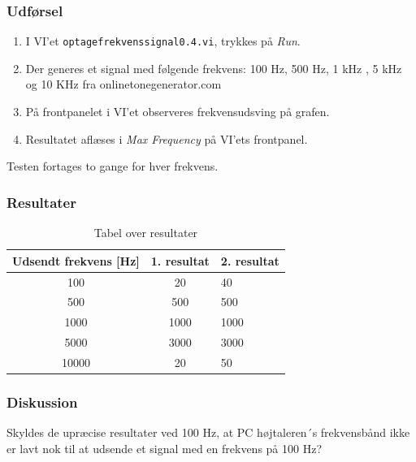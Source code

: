 		\subsubsection{Udførsel}
			\begin{enumerate}
				\item I VI'et \texttt{optagefrekvenssignal0.4.vi}, trykkes på \textit{Run}.  
				\item Der generes et signal med følgende frekvens: 100 Hz, 500 Hz, 1 kHz , 5 kHz og 10 KHz fra onlinetonegenerator.com
				\item På frontpanelet i VI'et observeres frekvensudsving på grafen.  
				\item Resultatet aflæses i \textit{Max Frequency} på VI'ets frontpanel.
			\end{enumerate}
			
			Testen fortages to gange for hver frekvens.  
		
		\subsubsection{Resultater}
		
		\begin{table}[]
				\centering
				\caption{Tabel over resultater}
				\label{bordtest5resultater}
				\begin{tabular}{lll}
					\multicolumn{1}{l|}{\textbf{Udsendt frekvens {[}Hz{]}}} & 	
					\multicolumn{1}{l|}{\textbf{1. resultat}} & \textbf{2. resultat} \\ \hline
					\multicolumn{1}{c|}{100}& 
					\multicolumn{1}{c|}{20}&40\\
					\multicolumn{1}{c|}{500}& 
					\multicolumn{1}{c|}{500}&500\\
					\multicolumn{1}{c|}{1000}& 
					\multicolumn{1}{c|}{1000}&1000\\
					\multicolumn{1}{c|}{5000}& 
					\multicolumn{1}{c|}{3000}&3000\\
					\multicolumn{1}{c|}{10000}& 
					\multicolumn{1}{c|}{20}&50\\
                   
				\end{tabular}
			\end{table}
		
		\subsubsection{Diskussion} 
		Skyldes de upræcise resultater ved 100 Hz, at PC højtaleren´s frekvensbånd ikke er lavt nok til at udsende et signal med en frekvens på 100 Hz? 
